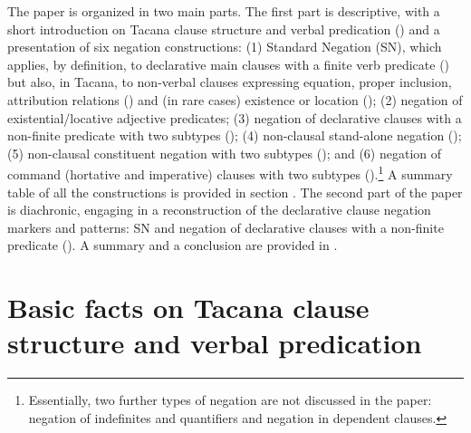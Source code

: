 \documentclass[output=paper]{langsci/langscibook}
\begin{document}
The paper is organized in two main parts. The first part is descriptive,
with a short introduction on Tacana clause structure and verbal predication
() and a presentation of six negation constructions:
(1) Standard Negation (SN), which applies, by definition, to
declarative main clauses with a finite verb predicate
\parencite{Miestamo2005}
() but also, in Tacana, to non-verbal clauses
expressing equation, proper inclusion,
attribution relations () and (in rare cases)
existence or location (); 
(2) negation of existential\slash loca\-ti\-ve adjective
predicates;
(3) negation of declarative clauses with a non-finite
predicate with two subtypes ();
(4) non-clausal stand-alone negation
(); 
(5) non-clausal constituent negation with two subtypes (); and
(6) negation of command (hortative and imperative) clauses with
two subtypes ().\footnote{Essentially, two further
types of negation are not discussed in the paper: negation of indefinites
and quantifiers and negation in dependent clauses.} A summary table of all the constructions is provided in section
. The second part
of the paper is diachronic, engaging in a reconstruction of the
declarative clause negation markers and patterns: SN and negation of
declarative clauses with a non-finite predicate ().
A summary and a conclusion are provided in .

\section{Basic facts on Tacana clause structure and verbal predication}%
\label{sec:tacana-2}
\end{document}
